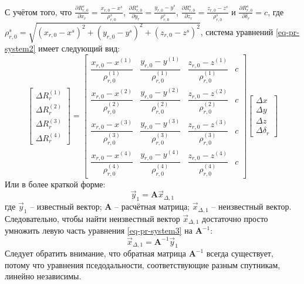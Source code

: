 С учётом того, что
$\frac{\partial R_{r,0}^s}{\partial x_r}=\frac{x_{r,0}-x^s}{\rho_{r,0}^s}$,
$\frac{\partial R_{r,0}^s}{\partial y_r}=\frac{y_{r,0}-y^s}{\rho_{r,0}^s}$,    
$\frac{\partial R_{r,0}^s}{\partial z_r}=\frac{z_{r,0}-z^s}{\rho_{r,0}^s}$
и $\frac{\partial R_{r,0}^s}{\partial \delta_r}=c$,  
где $\rho_{r,0}^s=\sqrt{(x_{r,0}-x^s)^2+(y_{r,0}-y^s)^2+(z_{r,0}-z^s)^2}$, система уравнений \eqref{eq-pr-system2} имеет следующий вид:   
\begin{equation}
\begin{bmatrix}
\Delta R_r^{(1)} \\ 
\Delta R_r^{(2)} \\ 
\Delta R_r^{(3)} \\
\Delta R_r^{(4)} 
\end{bmatrix} = \begin{bmatrix}
\dfrac{x_{r,0}-x^{(1)}}{\rho_{r,0}^{(1)}}&\dfrac{y_{r,0}-y^{(1)}}{\rho_{r,0}^{(1)}}&\dfrac{z_{r,0}-z^{(1)}}{\rho_{r,0}^{(1)}}&c \\[1em] 
\dfrac{x_{r,0}-x^{(2)}}{\rho_{r,0}^{(2)}}&\dfrac{y_{r,0}-y^{(2)}}{\rho_{r,0}^{(2)}}&\dfrac{z_{r,0}-z^{(2)}}{\rho_{r,0}^{(2)}}&c \\[1em]
\dfrac{x_{r,0}-x^{(3)}}{\rho_{r,0}^{(3)}}&\dfrac{y_{r,0}-y^{(3)}}{\rho_{r,0}^{(3)}}&\dfrac{z_{r,0}-z^{(3)}}{\rho_{r,0}^{(3)}}&c \\[1em]
\dfrac{x_{r,0}-x^{(4)}}{\rho_{r,0}^{(4)}}&\dfrac{y_{r,0}-y^{(4)}}{\rho_{r,0}^{(4)}}&\dfrac{z_{r,0}-z^{(4)}}{\rho_{r,0}^{(4)}}&c 
\end{bmatrix} \begin{bmatrix}
\Delta x \\ 
\Delta y \\ 
\Delta z \\
\Delta \delta_r   
\end{bmatrix}    
\end{equation} 
Или в более краткой форме:
\begin{equation}
\label{eq-pr-system3}
\vec{y}_1=\textbf{A}\vec{x}_{\Delta,1}   
\end{equation} 
где
$\vec{y}_1$ -- известный вектор;
$\textbf{A}$ -- расчётная матрица;
$\vec{x}_{\Delta,1}$ -- неизвестный вектор.  
Следовательно, чтобы найти неизвестный вектор $\vec{x}_{\Delta,1}$ достаточно просто умножить левую часть уравнения \eqref{eq-pr-system3} на $\textbf{A}^{-1}$:
\begin{equation}
\vec{x}_{\Delta,1}=\textbf{A}^{-1}\vec{y}_1   
\end{equation}  
Следует обратить внимание, что обратная матрица $\textbf{A}^{-1}$ всегда существует, потому что уравнения пседодальности, соответствующие разным спутникам, линейно независимы.

